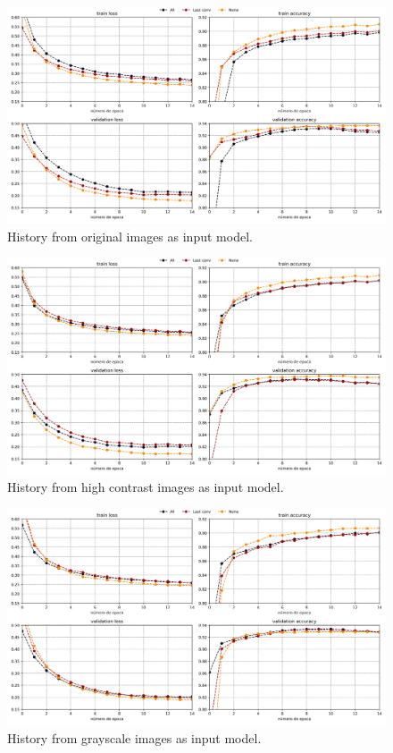 \begin{frame}
  \begin{figure}[H]
    \includegraphics[width=14cm]{Graphics/normal_history.png}
    \caption{History from original images as input model.}
  \end{figure}
\end{frame}

\begin{frame}
  \begin{figure}[H]
    \includegraphics[width=14cm]{Graphics/high_contrast/history.png}
    \caption{History from high contrast images as input model.}
  \end{figure}
\end{frame}

\begin{frame}
  \begin{figure}[H]
    \includegraphics[width=14cm]{Graphics/grayscale/history.png}
    \caption{History from grayscale images as input model.}
  \end{figure}
\end{frame}

